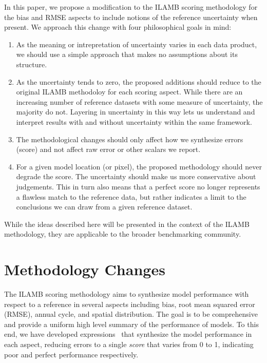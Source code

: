 \documentclass{agujournal}
\begin{document}
In this paper, we propose a modification to the ILAMB scoring methodology for the bias and RMSE aspects to include notions of the reference uncertainty when present. We approach this change with four philosophical goals in mind:
%
\begin{enumerate}
	\item As the meaning or intrepretation of uncertainty varies in each data product, we should use a simple approach that makes no assumptions about its structure.
	\item As the uncertainty tends to zero, the proposed additions should reduce to the original ILAMB methodoloy for each scoring aspect. While there are an increasing number of reference datasets with some measure of uncertainty, the majority do not. Layering in uncertainty in this way lets us understand and interpret results with and without uncertainty within the same framework.
	\item The methodological changes should only affect how we synthesize errors (score) and not affect raw error or other scalars we report.
	\item For a given model location (or pixel), the proposed methodology should never degrade the score. The uncertainty should make us more conservative about judgements. This in turn also means that a perfect score no longer represents a flawless match to the reference data, but rather indicates a limit to the conclusions we can draw from a given reference dataset.
\end{enumerate}
%
While the ideas described here will be presented in the context of the ILAMB methodology, they are applicable to the broader benchmarking community.

\section{Methodology Changes}\label{sec:method}

The ILAMB scoring methodology aims to synthesize model performance with respect to a reference in several aspects including bias, root mean squared error (RMSE), annual cycle, and spatial distribution. The goal is to be comprehensive and provide a uniform high level summary of the performance of models. To this end, we have developed expressions~\cite{Collier_JAMES_20181101} that synthesize the model performance in each aspect, reducing errors to a single \textit{score} that varies from 0 to 1, indicating poor and perfect performance respectively.
\end{document}
